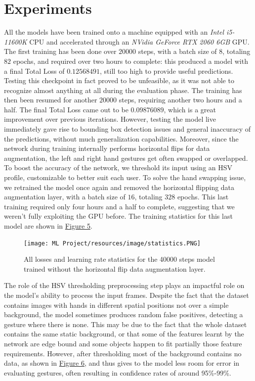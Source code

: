 \documentclass[a4paper, 12pt]{article}
\begin{document}
\section{Experiments}
\begin{flushleft}
All the models have been trained onto a machine equipped with an \textit{Intel i5-11600K} CPU and accelerated through an \textit{NVidia GeForce RTX 2060 6GB} GPU.
The first training has been done over $20000$ steps, with a batch size of $8$, totaling $82$ epochs, and required over two hours to complete: this produced a model with a final Total Loss of $0.12568491$, still too high to provide useful predictions. Testing this checkpoint in fact proved to be unfeasible, as it was not able to recognize almost anything at all during the evaluation phase.
The training has then been resumed for another $20000$ steps, requiring another two hours and a half. The final Total Loss came out to be $0.09876089$, which is a great improvement over previous iterations. However, testing the model live immediately gave rise to bounding box detection issues and general inaccuracy of the predictions, without much generalization capabilities. Moreover, since the network during training internally performs horizontal flips for data augmentation, the left and right hand gestures get often swapped or overlapped. To boost the accuracy of the network, we threshold its input using an HSV profile, customizable to better suit each user.
To solve the hand swapping issue, we retrained the model once again and removed the horizontal flipping data augmentation layer, with a batch size of $16$, totaling $328$ epochs. This last training required only four hours and a half to complete, suggesting that we weren't fully exploiting the GPU before.
The training statistics for this last model are shown in \hyperref[figure5]{Figure 5}.
\begin{figure}[!h]
    \centering
    \texttt{[image: ML Project/resources/image/statistics.PNG]} \caption{All losses and learning rate statistics for the 40000 steps model trained without the horizontal flip data augmentation layer.}
\end{figure}
\label{figure5}
The role of the HSV thresholding preprocessing step plays an impactful role on the model's ability to process the input frames. Despite the fact that the dataset contains images with hands in different spatial positions not over a simple background, the model sometimes produces random false positives, detecting a gesture where there is none. This may be due to the fact that the whole dataset contains the same static background, or that some of the features learnt by the network are edge bound and some objects happen to fit partially those feature requirements. However, after thresholding most of the background contains no data, as shown in \hyperref[figure6]{Figure 6}, and thus gives to the model less room for error in evaluating gestures, often resulting in confidence rates of around 95\%-99\%.


\end{flushleft}
\end{document}

